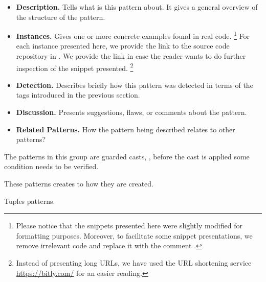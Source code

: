 \begin{itemize}
\item \textbf{Description.}
Tells what is this pattern about.
It gives a general overview of the structure of the pattern.
\item \textbf{Instances.}
Gives one or more concrete examples found in real code.%
\footnote{Please notice that the snippets presented here were slightly
modified for formatting purposes.
Moreover, to facilitate some snippet presentations,
we remove irrelevant code and replace it with the
comment \code{// [...]}.}
For each instance presented here, we provide the link to the source code repository in \lgtm{}.
We provide the link in case the reader wants to do further inspection
of the snippet presented.%
\footnote{Instead of presenting \lgtm{} long URLs,
we have used the URL shortening service \url{https://bitly.com/}
for an easier reading.}
\item \textbf{Detection.}
Describes briefly how this pattern was detected in terms of the tags introduced in the previous section.
\item \textbf{Discussion.}
Presents suggestions, flaws, or comments about the pattern.
\item \textbf{Related Patterns.}
How the pattern being described relates to other patterns?
\end{itemize}













The patterns in this group are guarded casts, \ie, before the cast is applied some condition needs to be verified.







These patterns creates to how they are created.










Tuples patterns.





